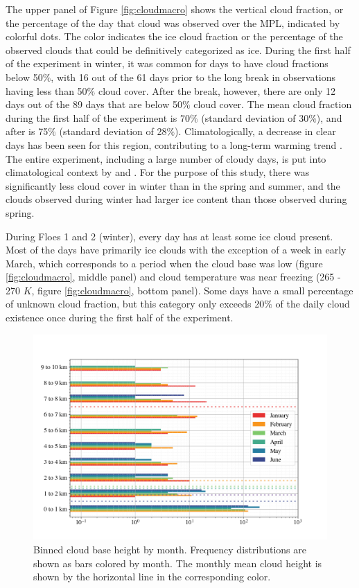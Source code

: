 The upper panel of Figure \ref{fig:cloudmacro} shows the vertical cloud fraction, or the percentage of the day that cloud was observed over the MPL, indicated by colorful dots. The color indicates the ice cloud fraction or the percentage of the observed clouds that could be definitively categorized as ice. During the first half of the experiment in winter, it was common for days to have cloud fractions below 50$\%$, with 16 out of the 61 days prior to the long break in observations having less than 50$\%$ cloud cover. After the break, however, there are only 12 days out of the 89 days that are below 50$\%$ cloud cover. The mean cloud fraction during the first half of the experiment is 70$\%$ (standard deviation of 30$\%$), and after is 75$\%$ (standard deviation of 28$\%$). Climatologically, a decrease in clear days has been seen for this region, contributing to a long-term warming trend \citep{kayser:2017}. The entire experiment, including a large number of cloudy days, is put into climatological context by \citet{graham:2017} and \citet{kayser:2017}. For the purpose of this study, there was significantly less cloud cover in winter than in the spring and summer, and the clouds observed during winter had larger ice content than those observed during spring.

During Floes 1 and 2 (winter), every day has at least some ice cloud present. Most of the days have primarily ice clouds with the exception of a week in early March, which corresponds to a period when the cloud base was low (figure \ref{fig:cloudmacro}, middle panel) and cloud temperature was near freezing (265 - 270 $K$, figure \ref{fig:cloudmacro}, bottom panel). Some days have a small percentage of unknown cloud fraction, but this category only exceeds 20$\%$ of the daily cloud existence once during the first half of the experiment. 

\begin{figure}[b!]
    \centering
    \includegraphics[width=1\linewidth]{figures/chapter4/CloudHeights.png}
    \caption[Cloud base height by month histogram.]{Binned cloud base height by month. Frequency distributions are shown as bars colored by month. The monthly mean cloud height is shown by the horizontal line in the corresponding color.}
    \label{fig:cloudbase}
\end{figure}

